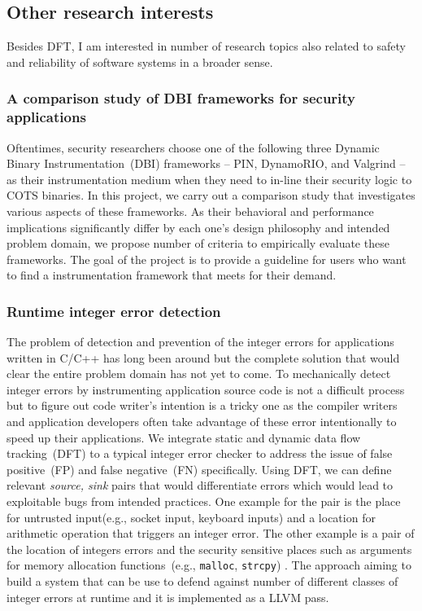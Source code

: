 \documentclass[letterpaper, 10pt]{article}
\begin{document}
\begin{small}
\subsection*{Other research interests}
%
Besides DFT, I am interested in number of research topics also related to
safety and reliability of software systems in a broader sense.

\subsubsection*{A comparison study of DBI frameworks for security applications}
%
Oftentimes, security researchers choose one of the following three Dynamic
Binary Instrumentation~(DBI) frameworks -- PIN, DynamoRIO, and Valgrind -- as
their instrumentation medium when they need to in-line their security logic to
COTS binaries.
%
In this project, we carry out a comparison study that investigates various
aspects of these frameworks. As their behavioral and performance implications
significantly differ by each one's design philosophy and intended problem
domain, we propose number of criteria  to empirically evaluate these frameworks.
%
The goal of the project is to provide a guideline for users who want to find a
instrumentation framework that meets for their demand.

\subsubsection*{Runtime integer error detection}

The problem of detection and prevention of the integer errors for applications
written in C/C++ has long been around but the complete solution that would
clear the entire problem domain has not yet to come. 
%
To mechanically detect integer errors by instrumenting application source code
is not a difficult process but to figure out code writer's intention is a
tricky one as the compiler writers and application developers often take
advantage of these error intentionally to speed up their applications.
%
We integrate static and dynamic data flow tracking~(DFT) to a typical integer
error checker to address the issue of false positive~(FP) and false
negative~(FN) specifically. Using DFT, we can define relevant {\it source,
sink} pairs that would differentiate errors which would lead to exploitable
bugs from intended practices. One example for the pair is the place for
untrusted input(e.g., socket input, keyboard inputs) and a location for
arithmetic operation that triggers an integer error. The other example is a
pair of the location of integers errors and the security sensitive places such
as arguments for memory allocation functions~(e.g., {\tt malloc}, {\tt strcpy}) .
%
The approach aiming to build a system that can be use to defend against number
of different classes of integer errors at runtime and it is implemented as a
LLVM pass.


\end{small}
\end{document}
